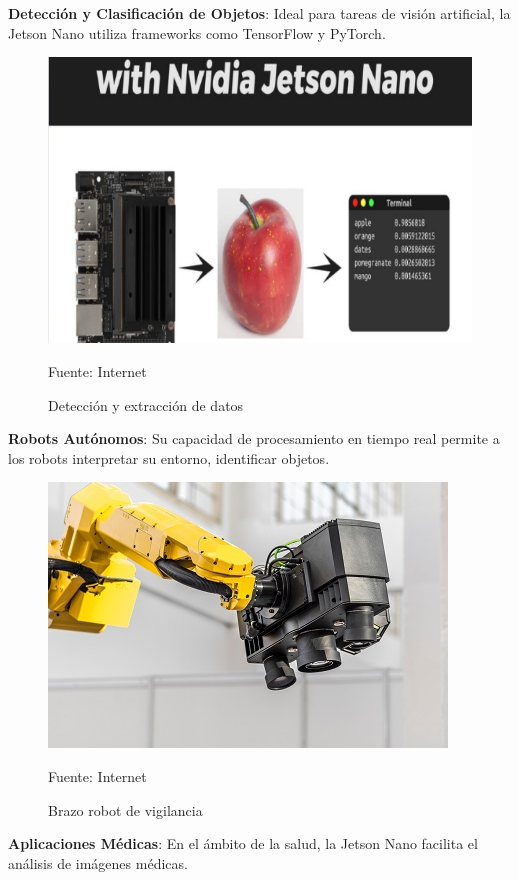 \textbf{Detección y Clasificación de Objetos}: Ideal para tareas de visión artificial, la Jetson Nano utiliza frameworks como TensorFlow y PyTorch.

\begin{figure}[H]
  \centering
  \includegraphics[scale = 0.7]{Imagenes/clasificacion_objetos.png}
  \caption{Detección y extracción de datos}{Fuente: Internet}
\end{figure}

\textbf{Robots Autónomos}: Su capacidad de procesamiento en tiempo real permite a los robots interpretar su entorno, identificar objetos.

\begin{figure}[H]
  \centering
  \includegraphics[scale = 1]{Imagenes/jetson_surveillance.jpg}
  \caption{Brazo robot de vigilancia}{Fuente: Internet}
\end{figure}

\textbf{Aplicaciones Médicas}: En el ámbito de la salud, la Jetson Nano facilita el análisis de imágenes médicas.

